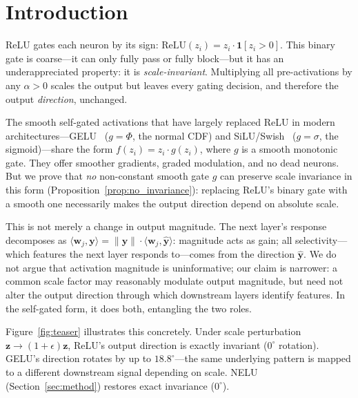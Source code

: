 \section{Introduction}\label{sec:intro}

ReLU gates each neuron by its sign: $\mathrm{ReLU}(z_i) = z_i \cdot \mathbf{1}[z_i > 0]$.
This binary gate is coarse---it can only fully pass or fully block---but it has an underappreciated property: it is \emph{scale-invariant}.
Multiplying all pre-activations by any $\alpha > 0$ scales the output but leaves every gating decision, and therefore the output \emph{direction}, unchanged.

The smooth self-gated activations that have largely replaced ReLU in modern architectures---GELU~\citep{hendrycks2016gaussian} ($g{=}\Phi$, the normal CDF) and SiLU/Swish~\citep{elfwing2018sigmoid,ramachandran2017searching} ($g{=}\sigma$, the sigmoid)---share the form $f(z_i) = z_i \cdot g(z_i)$, where $g$ is a smooth monotonic gate.
They offer smoother gradients, graded modulation, and no dead neurons.
But we prove that \emph{no} non-constant smooth gate $g$ can preserve scale invariance in this form (Proposition~\ref{prop:no_invariance}): replacing ReLU's binary gate with a smooth one necessarily makes the output direction depend on absolute scale.

This is not merely a change in output magnitude.
The next layer's response decomposes as $\langle \mathbf{w}_j, \mathbf{y}\rangle = \|\mathbf{y}\| \cdot \langle \mathbf{w}_j, \hat{\mathbf{y}}\rangle$: magnitude acts as gain; all selectivity---which features the next layer responds to---comes from the direction $\hat{\mathbf{y}}$.
We do not argue that activation magnitude is uninformative; our claim is narrower: a common scale factor may reasonably modulate output magnitude, but need not alter the output direction through which downstream layers identify features.
In the self-gated form, it does both, entangling the two roles.

Figure~\ref{fig:teaser} illustrates this concretely.
Under scale perturbation $\mathbf{z} \to (1{+}\epsilon)\mathbf{z}$, ReLU's output direction is exactly invariant ($0^\circ$ rotation).
GELU's direction rotates by up to $18.8^\circ$---the same underlying pattern is mapped to a different downstream signal depending on scale.
NELU (Section~\ref{sec:method}) restores exact invariance ($0^\circ$).


